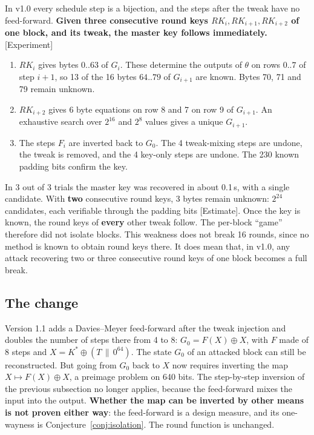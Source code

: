 \documentclass[11pt,a4paper]{article}
\newcommand{\ev}[1]{\textup{\textsf{[#1]}}}
\newcommand{\RK}{\mathit{RK}}
\begin{document}
In v1.0 every schedule step is a bijection, and the steps after the tweak have no feed-forward. \textbf{Given
three consecutive round keys $\RK_i, \RK_{i+1}, \RK_{i+2}$ of one block, and its tweak, the master key follows
immediately.} \ev{Experiment}
\begin{enumerate}
\item $\RK_i$ gives bytes $0..63$ of $G_i$. These determine the outputs of $\theta$ on rows $0..7$ of step $i+1$,
  so 13 of the 16 bytes $64..79$ of $G_{i+1}$ are known. Bytes 70, 71 and 79 remain unknown.
\item $\RK_{i+2}$ gives 6 byte equations on row 8 and 7 on row 9 of $G_{i+1}$. An exhaustive search over $2^{16}$
  and $2^8$ values gives a unique $G_{i+1}$.
\item The steps $F_i$ are inverted back to $G_0$. The 4 tweak-mixing steps are undone, the tweak is removed, and
  the 4 key-only steps are undone. The 230 known padding bits confirm the key.
\end{enumerate}
In 3 out of 3 trials the master key was recovered in about 0.1\,s, with a single candidate. With \textbf{two}
consecutive round keys, 3 bytes remain unknown: $2^{24}$ candidates, each verifiable through the padding bits
\ev{Estimate}. Once the key is known, the round keys of \textbf{every} other tweak follow. The per-block ``game''
therefore did not isolate blocks. This weakness does not break 16 rounds, since no method is known to obtain round
keys there. It does mean that, in v1.0, any attack recovering two or three consecutive round keys of one block
becomes a full break.

\subsection{The change}

Version 1.1 adds a Davies--Meyer feed-forward after the tweak injection and doubles the number of steps there from
4 to 8: $G_0 = F(X) \oplus X$, with $F$ made of 8 steps and $X = K^* \oplus (T \,\|\, 0^{64})$. The state $G_0$ of
an attacked block can still be reconstructed. But going from $G_0$ back to $X$ now requires inverting the map
$X \mapsto F(X) \oplus X$, a preimage problem on 640 bits. The step-by-step inversion of the previous subsection
no longer applies, because the feed-forward mixes the input into the output. \textbf{Whether the map can be
inverted by other means is not proven either way}: the feed-forward is a design measure, and its one-wayness is
Conjecture~\ref{conj:isolation}. The round function is unchanged.
\end{document}
